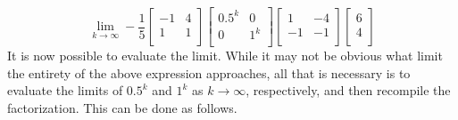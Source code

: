 \documentclass[titlepage]{article}
\begin{document}
\begin{equation*}
    \lim_{k\to\infty} -\frac{1}{5}
    \begin{bmatrix}
        -1 & 4\\
        1 & 1\\
    \end{bmatrix}
    \begin{bmatrix}
        0.5^k & 0\\
        0 & 1^k\\
    \end{bmatrix}
    \begin{bmatrix}
        1 & -4\\
        -1 & -1\\
    \end{bmatrix}
    \begin{bmatrix}
        6\\
        4\\
    \end{bmatrix}
\end{equation*}
It is now possible to evaluate the limit. While it may not be obvious what limit the entirety of the above expression approaches, all that is necessary is to evaluate the limits of $0.5^k$ and $1^k$ as $k\to\infty$, respectively, and then recompile the factorization. This can be done as follows.
\end{document}
